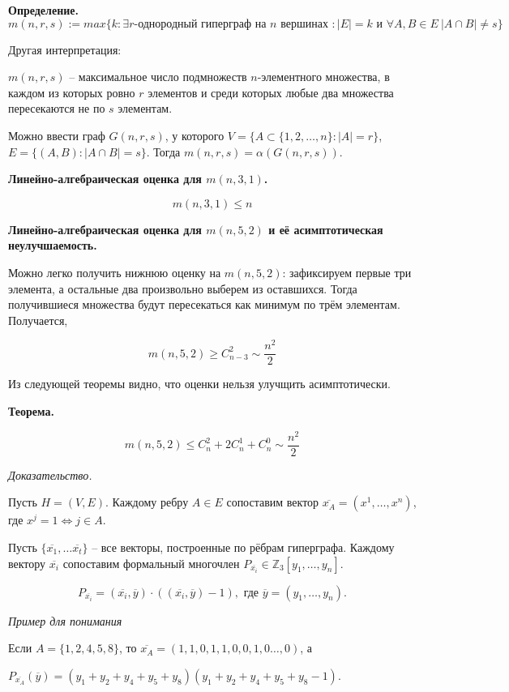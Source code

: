 \textbf{Определение.}
$$
m(n, r, s) := max \{ k : \exists r \text{-однородный гиперграф на } n \text{ вершинах } :
|E| = k \text{ и } \forall A, B \in E \ |A \cap B| \neq s \}
$$

Другая интерпретация:

$m(n, r, s)$ -- максимальное число подмножеств $n$-элементного множества, в каждом из
которых ровно $r$ элементов и среди которых любые два множества пересекаются не по $s$
элементам.

Можно ввести граф $G(n, r, s)$, у которого
$V = \{ A \subset \{1, 2, \ldots, n\} : |A| = r \}$,
$E = \{ (A, B) : |A \cap B| = s \}$.
Тогда $m(n, r, s) = \alpha(G(n, r, s))$.

\textbf{Линейно-алгебраическая оценка для $m(n, 3, 1)$.}

$$
m(n, 3, 1) \leq n
$$

\textbf{Линейно-алгебраическая оценка для $m(n, 5, 2)$ и её асимптотическая неулучшаемость.}

Можно легко получить нижнюю оценку на $m(n, 5, 2)$: зафиксируем первые три элемента, а остальные два произвольно выберем из оставшихся. Тогда получившиеся множества будут пересекаться как минимум по трём элементам. Получается, 

$$
m(n, 5, 2) \geqslant C_{n - 3}^2 \sim \frac{n^2}{2}
$$

Из следующей теоремы видно, что оценки нельзя улучщить асимптотически.

\textbf{Теорема.}

$$
m(n, 5, 2) \leqslant C_n^2 + 2C_n^1 + C_n^0 \sim \frac{n^2}{2}
$$

\textit{Доказательство.}

Пусть $H = (V, E)$. Каждому ребру $A \in E$ сопоставим вектор
$\overline{x_A} = (x^1, \ldots, x^n)$, где $x^j = 1 \Leftrightarrow j \in A$.

Пусть $\{ \overline{x_1}, \ldots \overline{x_t} \}$ -- все векторы, построенные 
по рёбрам гиперграфа.
Каждому вектору $\overline{x_i}$ сопоставим 
формальный многочлен $P_{\overline{x_i}} \in \mathbb{Z}_3 [y_1, \ldots, y_n]$.

$$
P_{\overline{x_i}} = (\overline{x_i}, \overline{y}) \cdot 
((\overline{x_i}, \overline{y}) - 1), \text{ где } \overline{y} = (y_1, \ldots, y_n).
$$

\textit{Пример для понимания}

Если $A = \{1, 2, 4, 5, 8\}$, то 
$\overline{x_A} = (1, 1, 0, 1, 1, 0, 0, 1, 0 \ldots, 0)$, а

$P_{\overline{x_A}}(\overline{y}) = 
(y_1 + y_2 + y_4 + y_5 + y_8) (y_1 + y_2 + y_4 + y_5 + y_8 - 1)$.
\\

